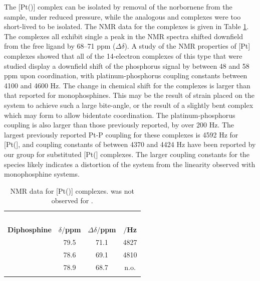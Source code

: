 The [Pt(\tButhixantphos)] complex can be isolated by removal of the norbornene from the sample, under reduced pressure, while the analogous \tBusixantphos{} and \tBuxantphos{} complexes were too short-lived to be isolated.  The \phosphorus{} NMR data for the complexes is given in Table \ref{table:Pt14NMR}.  The complexes all exhibit single a peak in the \phosphorus{} NMR spectra shifted downfield from the free ligand by 68--71 ppm ($\Delta\delta$).  A study of the \phosphorus{} NMR properties of [Pt] complexes showed that all of the 14-electron complexes of this type that were studied display a downfield shift of the phosphorus signal by between 48 and 58 ppm upon coordination, with platinum-phosphorus coupling constants between 4100 and 4600 Hz.\cite{Mann1980}  The change in chemical shift for the \tBuxantphos{} complexes is larger than that reported for monophosphines.  This may be the result of strain placed on the system to achieve such a large bite-angle, or the result of a slightly bent complex which may form to allow bidentate coordination.  The platinum-phosphorus coupling is also larger than those previously reported, by over 200 Hz.  The largest previously reported Pt-P coupling for these complexes is 4592 Hz for [Pt(], and coupling constants of between 4370 and 4424 Hz have been reported by our group for substituted [Pt(] complexes.\cite{Kathrynthesis, Rosieunpublished}  The larger coupling constants for the \tBuxantphos{} species likely indicates a distortion of the system from the linearity observed with monophosphine systems.  

\begin{table}[htbp]
\caption[\phosphorus{} NMR data for [Pt(\tBuxantphos){]} complexes]{\phosphorus{} NMR data for [Pt(\tBuxantphos){]} complexes. \JPtP{} was not observed for \tBuxantphos.}
\vspace{1em}
\label{table:Pt14NMR}
\small
\begin{center}
\begin{tabular}{l c c c}
\toprule{}
	~~ & \multicolumn{3}{c}{\bfseries{\phosphorus}} \\
	\cmidrule(lr){2-4}
	\bfseries{Diphosphine}&\bfseries{$\delta/$ppm}&\bfseries{$\Delta\delta/$ppm}&\bfseries{\JPtP{}$/$Hz}\\
	\midrule
	\tBuSixantphos 		& 79.5 & 71.1 & 4827 \\
	\tBuThixantphos 	& 78.6 & 69.1 & 4810 \\
	\tBuXantphos		& 78.9 & 68.7 & n.o.\\
	\bottomrule{}
\end{tabular}
\end{center}
\end{table}

